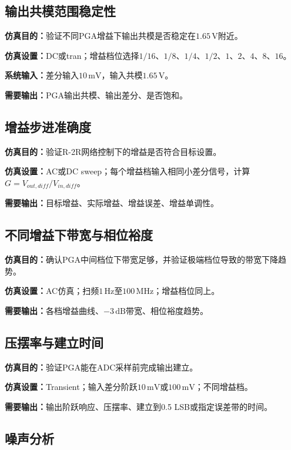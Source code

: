 \documentclass[12pt,a4paper]{ctexart}
\begin{document}
\subsection{输出共模范围稳定性}

\textbf{仿真目的：}验证不同PGA增益下输出共模是否稳定在$1.65\,\mathrm{V}$附近。

\textbf{仿真设置：}DC或tran；增益档位选择$1/16$、$1/8$、$1/4$、$1/2$、$1$、$2$、$4$、$8$、$16$。

\textbf{系统输入：}差分输入$10\,\mathrm{mV}$，输入共模$1.65\,\mathrm{V}$。

\textbf{需要输出：}PGA输出共模、输出差分、是否饱和。

\subsection{增益步进准确度}

\textbf{仿真目的：}验证R-2R网络控制下的增益是否符合目标设置。

\textbf{仿真设置：}AC或DC sweep；每个增益档输入相同小差分信号，计算$G=V_{out,diff}/V_{in,diff}$。

\textbf{需要输出：}目标增益、实际增益、增益误差、增益单调性。

\subsection{不同增益下带宽与相位裕度}

\textbf{仿真目的：}确认PGA中间档位下带宽足够，并验证极端档位导致的带宽下降趋势。

\textbf{仿真设置：}AC仿真；扫频$1\,\mathrm{Hz}$至$100\,\mathrm{MHz}$；增益档位同上。

\textbf{需要输出：}各档增益曲线、$-3\,\mathrm{dB}$带宽、相位裕度趋势。

\subsection{压摆率与建立时间}

\textbf{仿真目的：}验证PGA能在ADC采样前完成输出建立。

\textbf{仿真设置：}Transient；输入差分阶跃$10\,\mathrm{mV}$或$100\,\mathrm{mV}$；不同增益档。

\textbf{需要输出：}输出阶跃响应、压摆率、建立到0.5 LSB或指定误差带的时间。

\subsection{噪声分析}
\end{document}
